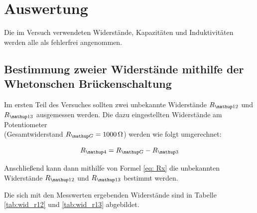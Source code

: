 \newpage
\section{Auswertung}

Die im Versuch verwendeten Widerstände, Kapazitäten und Induktivitäten %
werden alle als fehlerfrei angenommen.

\subsection{Bestimmung zweier Widerstände mithilfe der Whetonschen Brückenschaltung}

Im ersten Teil des Versuches sollten zwei unbekannte Widerstände $R_{\map{12}}$ und $R_{\map{13}}$ ausgemessen werden.
Die dazu eingestellten Widerstände am Potentiometer \\ (Gesamtwiderstand  %
$R_{\map{G}}=\SI{1000}{\ohm}$) werden wie folgt umgerechnet:

\begin{equation*}
R\ua{4}=R\ua{G}-R_{\map{3}}
\end{equation*}

Anschließend kann dann mithilfe von Formel \eqref{eq: Rx} die %
unbekannten Widerstände $R_{\map{12}}$ und $R_{\map{13}}$ bestimmt werden.

Die sich mit den Messwerten ergebenden Widerstände sind in Tabelle \ref{tab:wid_r12} und
\ref{tab:wid_r13} abgebildet.

